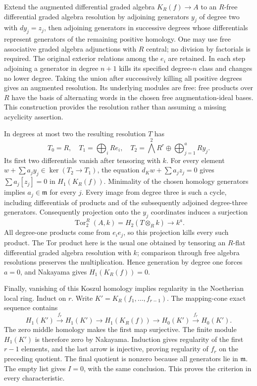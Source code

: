 Extend the augmented differential graded algebra \(K_R(f)\to A\) to an \(R\)-free differential graded algebra resolution by adjoining generators \(y_j\) of degree two with \(dy_j=z_j\), then adjoining generators in successive degrees whose differentials represent generators of the remaining positive homology. One may use free associative graded algebra adjunctions with \(R\) central; no division by factorials is required. The original exterior relations among the \(e_i\) are retained. In each step adjoining a generator in degree \(n+1\) kills its specified degree-\(n\) class and changes no lower degree. Taking the union after successively killing all positive degrees gives an augmented resolution. Its underlying modules are free: free products over \(R\) have the basis of alternating words in the chosen free augmentation-ideal bases. This construction provides the resolution rather than assuming a missing acyclicity assertion.

In degrees at most two the resulting resolution \(T\) has \[
T_0=R,\quad T_1=\bigoplus_i Re_i,\quad
T_2=\bigwedge^2R^r\oplus\bigoplus_{j=1}^a Ry_j.
\] Its first two differentials vanish after tensoring with \(k\). For every element \(w+\sum a_jy_j\in\ker(T_2\to T_1)\), the equation \(d_Kw+\sum a_jz_j=0\) gives \(\sum a_j[z_j]=0\) in \(H_1(K_R(f))\). Minimality of the chosen homology generators implies \(a_j\in\mathfrak m\) for every \(j\). Every image from degree three is such a cycle, including differentials of products and of the subsequently adjoined degree-three generators. Consequently projection onto the \(y_j\) coordinates induces a surjection \[
\operatorname{Tor}^R_2(A,k)=H_2(T\otimes_R k)\longrightarrow k^a.
\] All degree-one products come from \(e_i e_j\), so this projection kills every such product. The Tor product here is the usual one obtained by tensoring an \(R\)-flat differential graded algebra resolution with \(k\); comparison through free algebra resolutions preserves the multiplication. Hence generation by degree one forces \(a=0\), and Nakayama gives \(H_1(K_R(f))=0\).

Finally, vanishing of this Koszul homology implies regularity in the Noetherian local ring. Induct on \(r\). Write \(K'=K_R(f_1,\ldots,f_{r-1})\). The mapping-cone exact sequence contains \[
H_1(K')\xrightarrow{f_r}H_1(K')\to H_1(K_R(f))
\to H_0(K')\xrightarrow{f_r}H_0(K').
\] The zero middle homology makes the first map surjective. The finite module \(H_1(K')\) is therefore zero by Nakayama. Induction gives regularity of the first \(r-1\) elements, and the last arrow is injective, proving regularity of \(f_r\) on the preceding quotient. The final quotient is nonzero because all generators lie in \(\mathfrak m\). The empty list gives \(I=0\), with the same conclusion. This proves the criterion in every characteristic.

